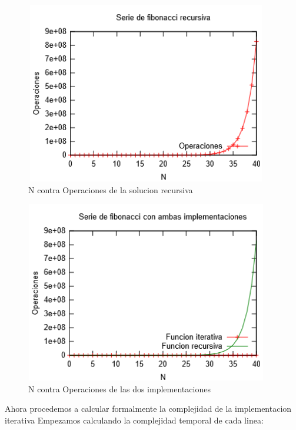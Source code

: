 \documentclass[spanish]{article}
\begin{document}
	\begin{figure}[H]
		\centering
		\includegraphics[width=400px,height=300px]{grafica2}
		\caption{N contra Operaciones de la solucion recursiva}
	\end{figure}
	\begin{figure}[H]
		\centering
		\includegraphics[width=400px,height=300px]{grafica3}
		\caption{N contra Operaciones de las dos implementaciones}
	\end{figure}
	Ahora procedemos a calcular formalmente la complejidad de la implementacion iterativa
	Empezamos calculando la complejidad temporal de cada linea:
\end{document}
